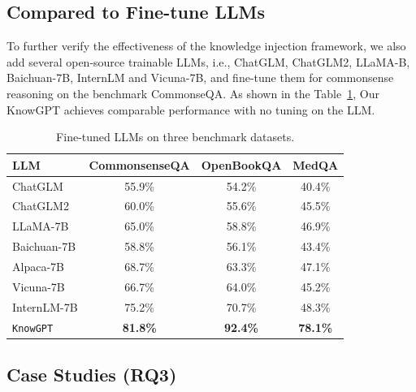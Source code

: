 \documentclass{article}
\theoremstyle{boldremark}
\begin{document}
\subsection{Compared to Fine-tune LLMs}\label{app:tuned_llm}
To further verify the effectiveness of  the knowledge injection framework, we also add several open-source trainable LLMs, i.e., ChatGLM, ChatGLM2, LLaMA-B, Baichuan-7B, InternLM and Vicuna-7B,  and fine-tune them for commonsense reasoning on the benchmark CommonseQA.  As shown in the Table~\ref{tab:finetune_llm}, Our KnowGPT achieves comparable performance with no tuning on the LLM. 
\begin{table}[thp]
\centering
    \caption{Fine-tuned LLMs on three benchmark datasets.}  
    \label{tab:finetune_llm} 
    \setlength\tabcolsep{15pt} %
    \begin{tabular}{l c c c }  
    \toprule  
     \textbf{LLM} &  \textbf{CommonsenseQA}  &  \textbf{OpenBookQA} &  \textbf{MedQA}\\ \midrule
     ChatGLM& 55.9\%  & 54.2\% & 40.4\%\\
    ChatGLM2& 60.0\% & 55.6\% & 45.5\% \\
    LLaMA-7B & 65.0\% & 58.8\% & 46.9\%\\
    Baichuan-7B& 58.8\% & 56.1\% & 43.4\%\\
    Alpaca-7B& 68.7\% & 63.3\% & 47.1\%\\
    Vicuna-7B& 66.7\% & 64.0\% & 45.2\%\\
     InternLM-7B & 75.2\% &70.7\% & 48.3\%\\
    
    \midrule
   \texttt{KnowGPT} & \textbf{81.8\%} & \textbf{92.4\%} &\textbf{78.1\%}\\

    \bottomrule  
    \end{tabular}
\end{table}  
\subsection{Case Studies (RQ3)}\label{sec:rq3}
\end{document}
